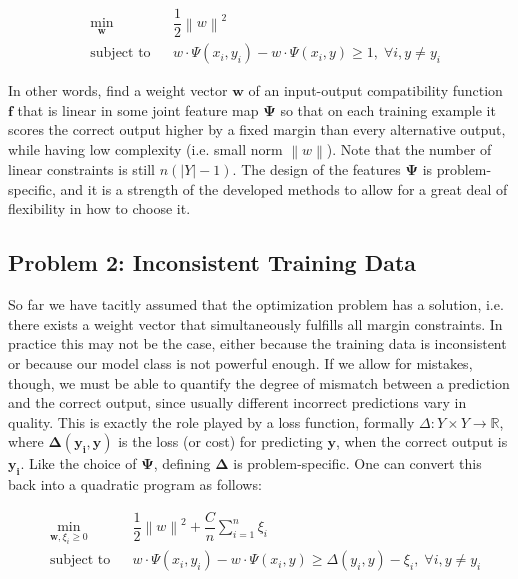 \documentclass[twoside]{article}
\newcommand{\norm}[1]{\left\lVert #1 \right\rVert}
\begin{document}
\begin{equation*}
\begin{aligned}
& \underset{\textbf{w}}{\text{min}}
& & \dfrac{1}{2} \norm{w}^2  \\
& \text{subject to}
& & w \cdot \Psi(x_{i},y_{i}) - w \cdot \Psi(x_{i},y) \geq 1 , \;\forall i, y \not = y_{i}
\end{aligned}
\end{equation*}

In other words, find a weight vector $\mathbf{w}$ of an input-output compatibility function $\mathbf{f}$ that is linear in some joint feature map $\mathbf{\Psi}$
so that on each training example it scores the correct output
higher by a fixed margin than every alternative output, while
having low complexity (i.e. small norm $\norm{w}$). Note that the
number of linear constraints is still $n(|Y| -1)$. The design of the features $\mathbf{\Psi}$ is problem-specific, and it is a
strength of the developed methods to allow for a great deal of flexibility in how to choose it.

\subsection{Problem 2: Inconsistent Training Data}
So far we have tacitly assumed that the optimization problem has a solution, i.e. there exists a weight vector
that simultaneously fulfills all margin constraints. In practice this may not be the case, either because the training
data is inconsistent or because our model class is not powerful enough. If we allow for mistakes, though, we must
be able to quantify the degree of mismatch between a prediction and the correct output, since usually different incorrect predictions vary in quality. This is exactly the role
played by a loss function, formally $ \Delta : Y \times Y \rightarrow \mathbb{R}$, where
$\mathbf{\Delta(y_{i},y)}$ is the loss (or cost) for predicting $\mathbf{y}$, when the correct output is $\mathbf{y_{i}}$. Like the choice of $\mathbf{\Psi}$, defining $\mathbf{\Delta}$
is problem-specific. One can convert this back into a
quadratic program as follows:

\begin{equation*}
\begin{aligned}
& \underset{\textbf{w}, \xi_{i} \geq 0}{\text{min}}
& & \dfrac{1}{2} \norm{w}^2 + \dfrac{C}{n} \sum_{i=1}^{n} \xi_{i} \\
& \text{subject to}
& & w \cdot \Psi(x_{i},y_{i}) - w \cdot \Psi(x_{i},y) \geq  \Delta(y_{i},y) - \xi_{i} , \;\forall i, y \not = y_{i}
\end{aligned}
\end{equation*}
\end{document}
